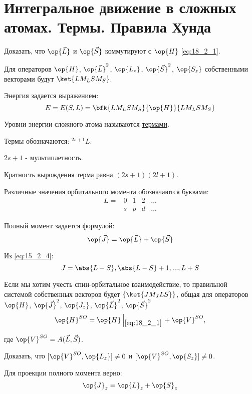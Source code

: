 \section{Интегральное движение в сложных атомах. Термы. Правила Хунда}

\begin{excr}
Доказать, что $\op{\vec{L}}$ и $\op{\vec{S}}$ коммутируют с $\op{H}$ \eqref{eq:18_2_1}.
\end{excr}

Для операторов $\op{H}$, $\op{\vec{L}}^2$, $\op{L_z}$, $\op{\vec{S}}^2$, $\op{S_z}$ собственными векторами будут $\ket{L M_L S M_S}$.

Энергия задается выражением: 
$$
E = E(S, L) = \bfk{L M_L S M_S}{\op{H}}{L M_L S M_S}
$$ 

Уровни энергии сложного атома называются \underline{термами}.

Термы обозначаются: $\boxed{^{2s+1}L}$.

$2s+1$ - мультиплетность.

Кратность вырождения терма равна $(2s+1)(2l+1)$.

Различные значения орбитального момента обозначаются буквами:
$$ 
\begin{matrix}
L= & 0 & 1 & 2& ...\\
      & s & p & d & ... 
\end{matrix}
$$

Полный момент задается формулой:
\begin{equation}
\label{eq:18_3_1}
\op{\vec{J}} = \op{\vec{L}} + \op{\vec{S}}
\end{equation}

Из \eqref{eq:15_2_4}:
$$
J = \abs{L-S}, \abs{L-S} + 1, ..., L+S
$$

Если мы хотим учесть спин-орбитальное взаимодействие, то правильной системой собственных векторов будет $\{ \ket{J M_J L S}\}$, общая для операторов $\op{H}$, $\op{\vec{J}}^2$, $\op{J_z}$, $\op{\vec{L}}^2$, $\op{\vec{S}}^2$
\begin{gather*}
\op{H}^{SO} = \op{H} \left |_{\eqref{eq:18_2_1}} \right . + \op{V}^{SO},
\end{gather*}

где $\op{V}^{SO} = A(\vec{L}, \vec{S})$.

\begin{excr}
Доказать, что $[\op{V}^{SO}, \op{L_z}] \not = 0$ и $[\op{V}^{SO}, \op{S_z}] \not = 0$.
\end{excr}

Для проекции полного момента верно:
$$
\op{J}_z = \op{L}_z + \op{S}_z
$$

